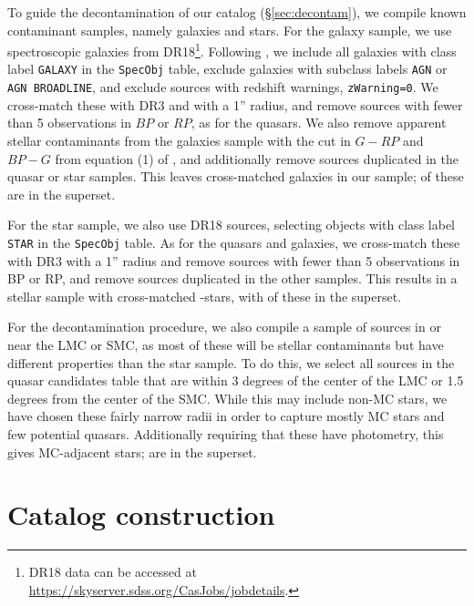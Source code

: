 To guide the decontamination of our catalog (\S\ref{sec:decontam}), we compile known contaminant samples, namely galaxies and stars.
For the galaxy sample, we use \SDSS spectroscopic galaxies from DR18\footnote{\SDSS DR18 data can be accessed at \url{https://skyserver.sdss.org/CasJobs/jobdetails}.}.
Following \citep{bailer-jones_dsc_2021}, we include all galaxies with class label \texttt{GALAXY} in the \texttt{SpecObj} table, exclude galaxies with subclass labels \texttt{AGN} or \texttt{AGN BROADLINE}, and exclude sources with redshift warnings, \texttt{zWarning=0}.
We cross-match these with \Gaia DR3 and \unWISE with a 1'' radius, and remove sources with fewer than 5 observations in $BP$ or $RP$, as for the \SDSS quasars.
We also remove apparent stellar contaminants from the galaxies sample with the cut in $G-RP$ and $BP-G$ from equation (1) of \cite{bailer-jones_quasar_2019}, and additionally remove sources duplicated in the \SDSS quasar or star samples.
This leaves  cross-matched \SDSS galaxies in our sample;  of these are in the \cat superset.

For the star sample, we also use \SDSS DR18 sources, selecting objects with class label \texttt{STAR} in the \texttt{SpecObj} table.
As for the quasars and galaxies, we cross-match these with \Gaia DR3 with a 1'' radius and remove sources with fewer than 5 observations in BP or RP, and remove sources duplicated in the other samples.
This results in a stellar sample with  cross-matched \SDSS-\Gaia stars, with  of these in the superset.

For the decontamination procedure, we also compile a sample of sources in or near the LMC or SMC, as most of these will be stellar contaminants but have different properties than the \SDSS star sample.
To do this, we select all sources in the \Gaia quasar candidates table that are within 3 degrees of the center of the LMC or 1.5 degrees from the center of the SMC.
While this may include non-MC stars, we have chosen these fairly narrow radii in order to capture mostly MC stars and few potential quasars.
Additionally requiring that these have \unWISE photometry, this gives  MC-adjacent stars;  are in the superset.


\section{Catalog construction}
\label{sec:construction}

